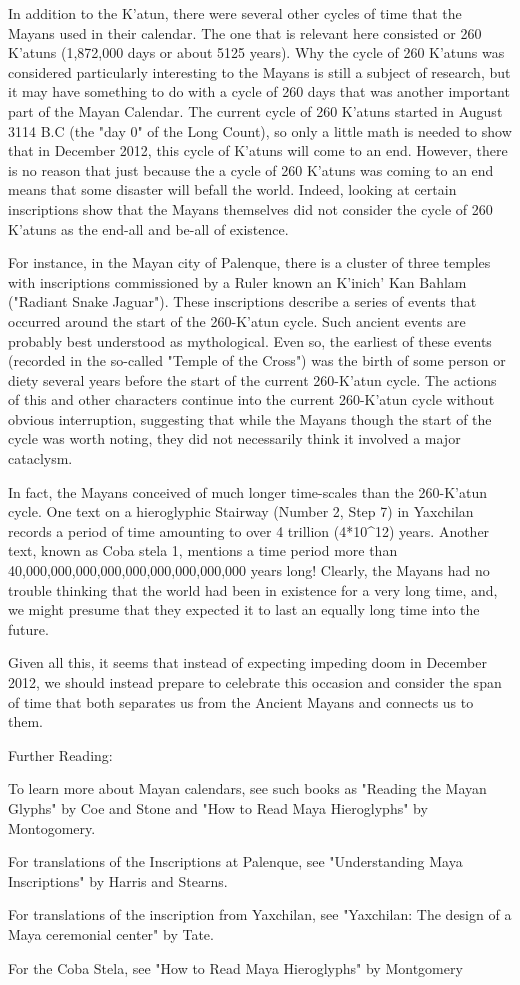 In addition to the K'atun, there were several other cycles of time that the Mayans used in their calendar. The one that is relevant here consisted or 260 K'atuns (1,872,000 days or about 5125 years). Why the cycle of 260 K'atuns was considered particularly interesting to the Mayans is still a subject of research, but it may have something to do with a cycle of 260 days that was another important part of the Mayan Calendar. The current cycle of 260 K'atuns started in August 3114 B.C (the "day 0" of the Long Count), so only a little math is needed to show that in December 2012, this cycle of K'atuns will come to an end. However, there is no reason that just because the a cycle of 260 K'atuns was coming to an end means that some disaster will befall the world. Indeed, looking at certain inscriptions show that the Mayans themselves did not consider the cycle of 260 K'atuns as the end-all and be-all of existence.

For instance, in the Mayan city of Palenque, there is a cluster of three temples with inscriptions commissioned by a Ruler known an K'inich' Kan Bahlam ("Radiant Snake Jaguar"). These inscriptions describe a series of events that occurred around the start of the 260-K'atun cycle. Such ancient events are probably best understood as mythological. Even so, the earliest of these events (recorded in the so-called "Temple of the Cross") was the birth of some person or diety several years before the start of the current 260-K'atun cycle. The actions of this and other characters continue into the current 260-K'atun cycle without obvious interruption, suggesting that while the Mayans though the start of the cycle was worth noting, they did not necessarily think it involved a major cataclysm. 

In fact, the Mayans conceived of much longer time-scales than the 260-K'atun cycle. One text on a hieroglyphic Stairway (Number 2, Step 7) in Yaxchilan records a period of time amounting to over 4 trillion  (4*10^12) years. Another text, known as Coba stela 1, mentions a time period more than 40,000,000,000,000,000,000,000,000,000 years long!  Clearly, the Mayans had no trouble thinking that the world had been in existence for a very long time, and, we might presume that they expected it to last an equally long time into the future.

Given all this, it seems that instead of expecting impeding doom in December 2012, we should instead prepare to celebrate this occasion and consider the span of time that both separates us from the Ancient Mayans and  connects us to them. 

Further Reading:

To learn more about Mayan calendars, see such books as "Reading the Mayan Glyphs" by Coe and Stone and "How to Read Maya Hieroglyphs" by Montogomery.

For translations of the Inscriptions at Palenque, see "Understanding Maya Inscriptions" by Harris and Stearns.

For translations of the inscription from Yaxchilan, see "Yaxchilan: The design of a Maya ceremonial center" by Tate.

For the Coba Stela, see "How to Read Maya Hieroglyphs" by Montgomery 

